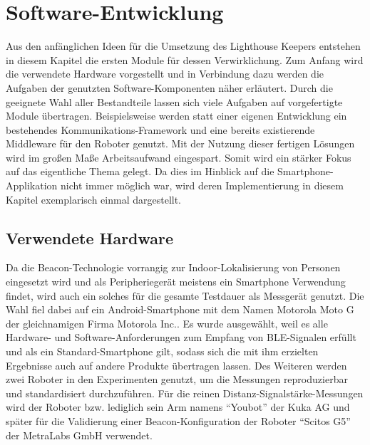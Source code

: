 \chapter{Software-Entwicklung}
Aus den anfänglichen Ideen für die Umsetzung des Lighthouse Keepers entstehen in diesem Kapitel die ersten Module für dessen Verwirklichung. Zum Anfang wird die verwendete Hardware vorgestellt und in Verbindung dazu werden die Aufgaben der genutzten Software-Komponenten näher erläutert. Durch die geeignete Wahl aller Bestandteile lassen sich viele Aufgaben auf vorgefertigte Module übertragen. Beispielsweise werden statt einer eigenen Entwicklung ein bestehendes Kommunikations-Framework und eine bereits existierende Middleware für den Roboter genutzt. Mit der Nutzung dieser fertigen Lösungen wird im großen Maße Arbeitsaufwand eingespart.  Somit wird ein stärker Fokus auf das eigentliche Thema gelegt. Da dies im Hinblick auf die Smartphone-Applikation nicht immer möglich war, wird deren Implementierung in diesem Kapitel exemplarisch einmal dargestellt. 
\section{Verwendete Hardware}
Da die Beacon-Technologie vorrangig zur Indoor-Lokalisierung von Personen eingesetzt wird und als Peripheriegerät meistens ein Smartphone Verwendung findet, wird auch ein solches für die gesamte Testdauer als Messgerät genutzt. Die Wahl fiel dabei auf ein Android-Smartphone mit dem Namen Motorola Moto G der gleichnamigen Firma Motorola Inc.. Es wurde ausgewählt, weil es alle Hardware- und Software-Anforderungen zum Empfang von BLE-Signalen erfüllt und als ein Standard-Smartphone gilt, sodass sich die mit ihm erzielten Ergebnisse auch auf andere Produkte übertragen lassen. Des Weiteren werden zwei Roboter in den Experimenten genutzt, um die Messungen reproduzierbar und standardisiert durchzuführen. Für die reinen Distanz-Signalstärke-Messungen wird der Roboter bzw. lediglich sein Arm namens "`Youbot"' der Kuka AG und später für die Validierung einer Beacon-Konfiguration der Roboter "`Scitos G5"' der MetraLabs GmbH verwendet. 
